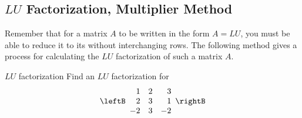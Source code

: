 \subsection{$LU$ Factorization, Multiplier Method}

Remember that for a matrix $A$ to be written in the form $A=LU$, you must be able to reduce it to its \ef\; without interchanging rows. The following method gives a process for calculating the $LU$ factorization of such a matrix $A$. 

\begin{example}{$LU$ factorization}\label{exa:lufactorization}
Find an $LU$ factorization for 
\begin{equation*}
\leftB 
\begin{array}{rrr}
1 & 2 & 3 \\ 
2 & 3 & 1 \\ 
-2 & 3 & -2
\end{array}
\rightB
\end{equation*}
\end{example}

